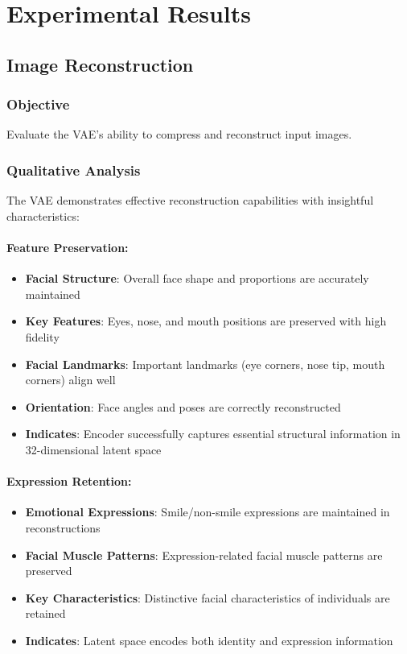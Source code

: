 \documentclass[conference]{IEEEtran}
\begin{document}
\section{Experimental Results}

\subsection{Image Reconstruction}

\subsubsection{Objective}
Evaluate the VAE's ability to compress and reconstruct input images.

\subsubsection{Qualitative Analysis}

The VAE demonstrates effective reconstruction capabilities with insightful characteristics:

\paragraph{Feature Preservation:}
\begin{itemize}
    \item \textbf{Facial Structure}: Overall face shape and proportions are accurately maintained
    \item \textbf{Key Features}: Eyes, nose, and mouth positions are preserved with high fidelity
    \item \textbf{Facial Landmarks}: Important landmarks (eye corners, nose tip, mouth corners) align well
    \item \textbf{Orientation}: Face angles and poses are correctly reconstructed
    \item \textbf{Indicates}: Encoder successfully captures essential structural information in 32-dimensional latent space
\end{itemize}

\paragraph{Expression Retention:}
\begin{itemize}
    \item \textbf{Emotional Expressions}: Smile/non-smile expressions are maintained in reconstructions
    \item \textbf{Facial Muscle Patterns}: Expression-related facial muscle patterns are preserved
    \item \textbf{Key Characteristics}: Distinctive facial characteristics of individuals are retained
    \item \textbf{Indicates}: Latent space encodes both identity and expression information
\end{itemize}
\end{document}
